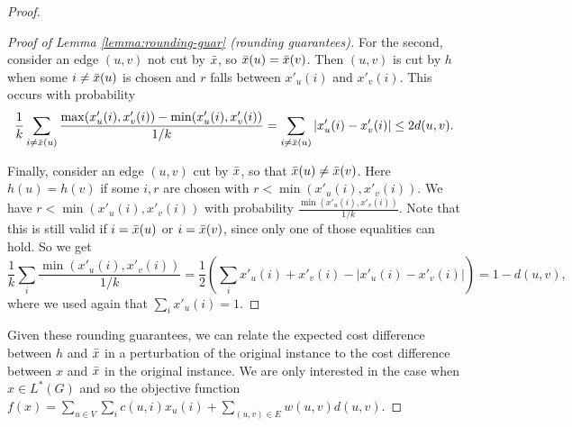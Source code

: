 \begin{proof}
\begin{proof}[Proof of Lemma \ref{lemma:rounding-guar} (rounding guarantees)]
For the second, consider an edge $(u,v)$ not cut by $\bar{x}$, so $\bar{x}(u) = \bar{x}(v)$. Then $(u,v)$ is cut by $h$ when some $i \ne \bar{x}(u)$ is chosen and $r$ falls between $x'_u(i)$ and $x'_v(i)$. This occurs with probability \[\frac{1}{k}\sum_{i\ne \bar{x}(u)}\frac{\max(x'_u(i), x'_v(i))-\min(x'_u(i), x'_v(i))}{1/k} = \sum_{i\ne \bar{x}(u)} |x'_u(i) - x'_v(i)| \le 2d(u,v).\]

Finally, consider an edge $(u,v)$ cut by $\bar{x}$, so that $\bar{x}(u) \ne \bar{x}(v)$. Here $h(u) = h(v)$ if some $i,r$ are chosen with $r < \min(x'_u(i), x'_v(i))$. We have $r < \min(x'_u(i), x'_v(i))$ with probability $\frac{\min(x'_u(i), x'_v(i))}{1/k}$. Note that this is still valid if $i=\bar{x}(u)$ or $i=\bar{x}(v)$, since only one of those equalities can hold.
So we get \[ \frac{1}{k}
\sum_{i} \frac{\min(x'_u(i),x'_v(i))}{1/k}  = \frac{1}{2}\left(\sum_i x'_u(i) + x'_v(i) - |x'_u(i) - x'_v(i)|\right) = 1 - d(u,v),
\]
where we used again that $\sum_i x'_u(i) = 1$.
\end{proof}
Given these rounding guarantees, we can relate the expected cost difference between $h$ and $\bar{x}$ in a perturbation of the original instance to the cost difference between $x$ and $\bar{x}$ in the original instance. We are only interested in the case when $x \in L^*(G)$ and so the objective function $f(x) = \sum_{u\in V}\sum_i c(u,i)x_u(i) + \sum_{(u,v) \in E}w(u,v)d(u,v)$.


\end{proof}
